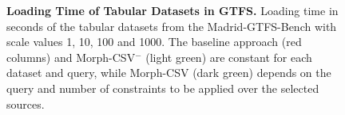\begin{figure}[!ht]
  \centering
  \qquad
\caption[Loading Time of Tabular Datasets in GTFS]{\textbf{Loading Time of Tabular Datasets in GTFS.} Loading time in seconds of the tabular datasets from the Madrid-GTFS-Bench with scale values 1, 10, 100 and 1000. The baseline approach (red columns) and Morph-CSV$^-$ (light green) are constant for each dataset and query, while Morph-CSV (dark green) depends on the query and number of constraints to be applied over the selected sources.}
\label{fig:gtfsload}
\end{figure}



